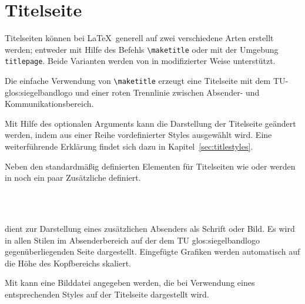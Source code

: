 \section{Titelseite}\label{sec:titlepage}

Titelseiten können bei \LaTeX\ generell auf zwei verschiedene Arten erstellt
werden; entweder mit Hilfe des Befehls \lstinline{\maketitle} oder mit
der Umgebung \lstinline{titlepage}. Beide Varianten werden von \tubslatex
in modifizierter Weise unterstützt.

\begin{Declaration}
\end{Declaration}

Die einfache Verwendung von \lstinline{\maketitle} erzeugt eine Titelseite
mit dem TU-\gls{glos:siegelbandlogo} und einer roten Trennlinie zwischen Absender- und
Kommunikationsbereich.

Mit Hilfe des optionalen Arguments  kann die Darstellung
der Titelseite geändert werden, indem aus einer Reihe vordefinierter Styles
ausgewählt wird. Eine weiterführende Erklärung findet
sich dazu in Kapitel~\ref{sec:titlestyles}.\bigskip

Neben den standardmäßig definierten Elementen für Titelseiten wie 
oder  werden in \tubslatex noch ein paar Zusätzliche definiert.

\begin{Declaration}
  \\
  \\
\end{Declaration}

 dient zur Darstellung eines zusätzlichen Absenders als Schrift
oder Bild. Es wird in allen Stilen im Absenderbereich auf der dem
TU \gls{glos:siegelbandlogo} gegenüberliegenden Seite dargestellt. Eingefügte Grafiken
werden automatisch auf die Höhe des Kopfbereichs skaliert.

Mit  kann eine Bilddatei angegeben werden, die bei
Verwendung eines entsprechenden Styles auf der Titelseite dargestellt wird.

